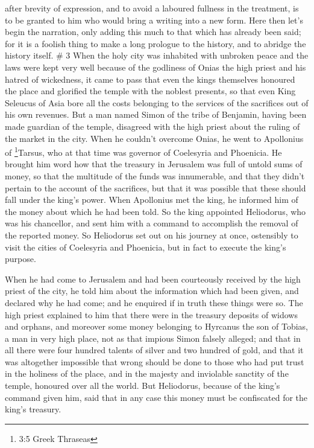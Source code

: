after brevity of expression, and to avoid a laboured fullness in the
treatment, is to be granted to him who would bring a writing into a new
form.  Here then let's begin the narration, only adding
this much to that which has already been said; for it is a foolish thing
to make a long prologue to the history, and to abridge the history
itself. \# 3  When the holy city was inhabited with unbroken
peace and the laws were kept very well because of the godliness of Onias
the high priest and his hatred of wickedness,  it came to
pass that even the kings themselves honoured the place and glorified the
temple with the noblest presents,  so that even King
Seleucus of Asia bore all the costs belonging to the services of the
sacrifices out of his own revenues.  But a man named Simon
of the tribe of Benjamin, having been made guardian of the temple,
disagreed with the high priest about the ruling of the market in the
city.  When he couldn't overcome Onias, he went to
Apollonius of \footnote{3:5 Greek Thraseas}Tarsus, who at that time was
governor of Coelesyria and Phoenicia.  He brought him word
how that the treasury in Jerusalem was full of untold sums of money, so
that the multitude of the funds was innumerable, and that they didn't
pertain to the account of the sacrifices, but that it was possible that
these should fall under the king's power.  When Apollonius
met the king, he informed him of the money about which he had been told.
So the king appointed Heliodorus, who was his chancellor, and sent him
with a command to accomplish the removal of the reported money.
 So Heliodorus set out on his journey at once, ostensibly to
visit the cities of Coelesyria and Phoenicia, but in fact to execute the
king's purpose.

 When he had come to Jerusalem and had been courteously
received by the high priest of the city, he told him about the
information which had been given, and declared why he had come; and he
enquired if in truth these things were so.  The high priest
explained to him that there were in the treasury deposits of widows and
orphans,  and moreover some money belonging to Hyrcanus the
son of Tobias, a man in very high place, not as that impious Simon
falsely alleged; and that in all there were four hundred talents of
silver and two hundred of gold,  and that it was altogether
impossible that wrong should be done to those who had put trust in the
holiness of the place, and in the majesty and inviolable sanctity of the
temple, honoured over all the world.  But Heliodorus,
because of the king's command given him, said that in any case this
money must be confiscated for the king's treasury.

